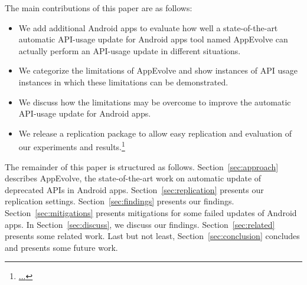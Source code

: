 The main contributions of this paper are as follows:
\begin{itemize}
	\item We  add additional Android apps to evaluate how well a state-of-the-art automatic API-usage update for Android apps tool named AppEvolve can actually perform an API-usage update in different situations.
	\item We categorize the limitations of AppEvolve and show instances of API usage instances in which these limitations can be demonstrated.
	\item We discuss how the limitations may be overcome to improve the automatic API-usage update for Android apps.
	\item We release a replication package to allow easy replication and evaluation of our experiments and results.\footnote{\url{...}}
\end{itemize}

The remainder of this paper is structured as follows. Section~\ref{sec:approach} describes AppEvolve, the state-of-the-art work on automatic update of deprecated APIs in Android apps. Section~\ref{sec:replication} presents our replication settings. Section~\ref{sec:findings} presents our findings. Section~\ref{sec:mitigations} presents mitigations for some failed updates of Android apps. In Section~\ref{sec:discuss}, we discuss our findings. Section~\ref{sec:related} presents some related work. Last but not least, Section~\ref{sec:conclusion} concludes and presents some future work.
